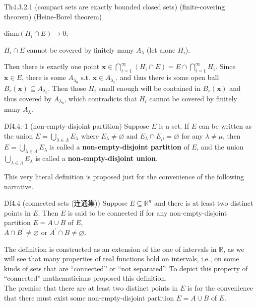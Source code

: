 \documentclass{article}
\begin{document}
\begin{Th}{Th4.3.2.1 (compact sets are exactly bounded closed sets) (finite-covering theorem) (Heine-Borel theorem)}
\begin{compactenum}
\begin{compactenum}
            \item $\text{diam}(H_i\cap E)\rightarrow 0$;
            \item $H_i\cap E$ cannot be covered by finitely many $A_\lambda$ (let alone $H_i$).
        \end{compactenum}
        Then there is exactly one point $\pmb{x}\in\bigcap_{i=1}^\infty (H_i\cap E) = E\cap \bigcap_{i=1}^\infty H_i$. Since $\pmb{x}\in E$, there is some $A_{\lambda_0}$ s.t. $\pmb{x}\in A_{\lambda_0}$, and thus there is some open ball $B_r(\pmb{x})\subseteq A_{\lambda_0}$. Then those $H_i$ small enough will be contained in $B_r(\pmb{x})$ and thus covered by $A_{\lambda_0}$, which contradicts that $H_i$ cannot be covered by finitely many $A_\lambda$.
    \end{compactenum}
\end{Th}

\begin{Df}{Df4.4.-1 (non-empty-disjoint partition)}
    Suppose $E$ is a set. If $E$ can be written as the union $E = \bigcup_{\lambda\in\Lambda} E_\lambda$ where $E_\lambda\neq\varnothing$ and $E_\lambda\cap E_\mu = \varnothing$ for any $\lambda\neq\mu$, then $E = \bigcup_{\lambda\in\Lambda} E_\lambda$ is called a \textbf{non-empty-disjoint partition} of $E$, and the union $\bigcup_{\lambda\in\Lambda} E_\lambda$ is called a \textbf{non-empty-disjoint union}.
\end{Df}

\begin{Rmk}{}
    This very literal definition is proposed just for the convenience of the following narrative.
\end{Rmk}

\begin{Df}{Df4.4 (connected sets (连通集))}
    Suppose $E\subseteq\mathbb{R}^n$ and there is at least two distinct points in $E$. Then $E$ is said to be connected if for any non-empty-disjoint partition $E = A\cup B$ of $E$, \\
    $A\cap B^\prime\neq\varnothing$ or $A^\prime\cap B\neq\varnothing$.
\end{Df}

\begin{Rmk}{}
    The definition is constructed as an extension of the one of intervals in $\mathbb{R}$, as we will see that many properties of real functions hold on intervals, i.e., on some kinds of sets that are ``connected'' or ``not separated''. To depict this property of ``connected'' mathematicians proposed this definition.\\
    The premise that there are at least two distinct points in $E$ is for the convenience that there must exist some non-empty-disjoint partition $E = A\cup B$ of $E$.
\end{Rmk}
\end{document}
